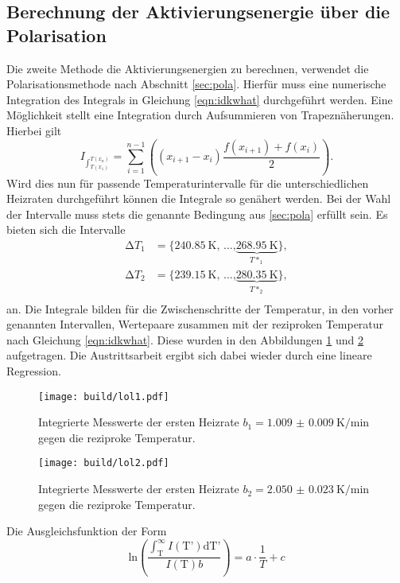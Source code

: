 \subsection{Berechnung der Aktivierungsenergie über die Polarisation}
Die zweite Methode die Aktivierungsenergien zu berechnen, verwendet die Polarisationsmethode nach Abschnitt \ref{sec:pola}. Hierfür muss eine numerische 
Integration des Integrals in Gleichung \eqref{eqn:idkwhat} durchgeführt werden. Eine Möglichkeit stellt eine Integration durch
Aufsummieren von Trapeznäherungen. Hierbei gilt 
\begin{equation}
I_{\int_{T(x_1)}^{T(x_n)}} = \sum_{i=1}^{n-1} \left( (x_{i+1} - x_{i}) \frac{f(x_{i+1}) + f(x_{i})}{2}\right).
\end{equation}
Wird dies nun für passende Temperaturintervalle für die unterschiedlichen Heizraten durchgeführt können die Integrale so genähert werden.
Bei der Wahl der Intervalle muss stets die genannte Bedingung aus \ref{sec:pola} erfüllt sein. Es bieten sich die Intervalle
\begin{align*}
\increment T_1 &= \{\SI{240.85}{\kelvin}\text{, ...,} \underbrace{\SI{268.95}{\kelvin}}_{T*_1}\}, \\
\increment T_2 &= \{\SI{239.15}{\kelvin}\text{, ...,} \underbrace{\SI{280.35}{\kelvin}}_{T*_2}\}, \\
\end{align*}
an. Die Integrale bilden für die Zwischenschritte der Temperatur, in den vorher genannten Intervallen, Wertepaare zusammen mit der reziproken Temperatur nach 
Gleichung \eqref{eqn:idkwhat}. Diese wurden in den Abbildungen \ref{fig:lol1} und \ref{fig:lol2} aufgetragen. Die Austrittsarbeit ergibt sich dabei wieder durch eine lineare 
Regression.
\begin{figure}
    \centering
    \texttt{[image: build/lol1.pdf]}
    \caption{Integrierte Messwerte der ersten Heizrate \newline $b_1 = \SI{1.009(9)}{\kelvin\per\minute}$ gegen die reziproke Temperatur.
            }
    \label{fig:lol1}
\end{figure}
\begin{figure}
    \centering
    \texttt{[image: build/lol2.pdf]}
    \caption{Integrierte Messwerte der ersten Heizrate \newline $b_2 = \SI{2.050(23)}{\kelvin\per\minute}$ gegen die reziproke Temperatur.
            }
    \label{fig:lol2}
\end{figure}
Die Ausgleichsfunktion der Form
\begin{equation}
\text{ln} \left( \frac{\int_{\text{T}}^{\infty} I(\text{T'}) \text{dT'} }{I(\text{T})b}\right) = a \cdot \frac{1}{T} + c
\end{equation}
